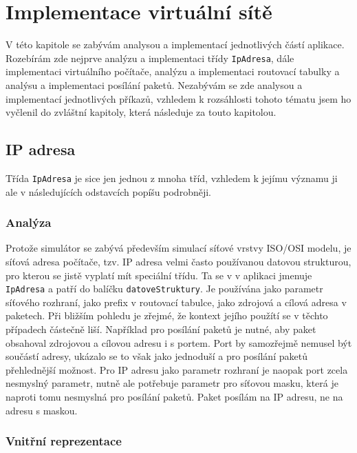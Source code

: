 
\chapter{Implementace virtuální sítě}

V této kapitole se zabývám analysou a implementací jednotlivých částí aplikace. Rozebírám zde nejprve analýzu a implementaci třídy \verb|IpAdresa|, dále implementaci virtuálního počítače, analýzu a implementaci routovací tabulky a analýsu a implementaci posílání paketů. Nezabývám se zde analysou a implementací jednotlivých příkazů, vzhledem k rozsáhlosti tohoto tématu jsem ho vyčlenil do zvláštní kapitoly, která následuje za touto kapitolou.




\section{IP adresa}

Třída \verb|IpAdresa| je sice jen jednou z mnoha tříd, vzhledem k jejímu významu ji ale v následujících odstavcích popíšu podrobněji.


\subsection{Analýza}

Protože simulátor se zabývá především simulací síťové vrstvy ISO/OSI modelu, je síťová adresa počítače, tzv. IP adresa velmi často používanou datovou strukturou, pro kterou se jistě vyplatí mít speciální třídu. Ta se v v aplikaci jmenuje \verb|IpAdresa| a patří do balíčku \verb|datoveStruktury|. Je používána jako parametr síťového rozhraní, jako prefix v routovací tabulce, jako zdrojová a cílová adresa v paketech. Při bližším pohledu je zřejmé, že kontext jejího použítí se v těchto případech částečně liší. Například pro posílání paketů je nutné, aby paket obsahoval zdrojovou a cílovou adresu i s portem. Port by samozřejmě nemusel být součástí adresy, ukázalo se to však jako jednoduší a pro posílání paketů přehlednější možnost. Pro IP adresu jako parametr rozhraní je naopak port zcela nesmyslný parametr, nutně ale potřebuje parametr pro síťovou masku, která je naproti tomu nesmyslná pro posílání paketů. Paket posílám na IP adresu, ne na adresu s maskou.


\subsection{Vnitřní reprezentace}

